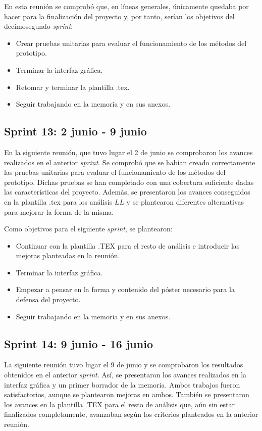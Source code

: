 En esta reunión se comprobó que, en líneas generales, únicamente quedaba por hacer para la finalización del proyecto y, por tanto, serían los objetivos del decimosegundo \textit{sprint}:
\begin{itemize}
\item Crear pruebas unitarias para evaluar el funcionamiento de los métodos del prototipo.
\item Terminar la interfaz gráfica.
\item Retomar y terminar la plantilla .tex.
\item Seguir trabajando en la memoria y en sus anexos.
\end{itemize}


\subsection{Sprint 13: 2 junio - 9 junio}
En la siguiente reunión, que tuvo lugar el 2 de junio se comprobaron los avances realizados en el anterior \textit{sprint}. Se comprobó que se habían creado correctamente las pruebas unitarias para evaluar el funcionamiento de los métodos del prototipo. Dichas pruebas se han completado con una cobertura suficiente dadas las características del proyecto. Además, se presentaron los avances conseguidos en la plantilla .tex para los análisis $LL$ y se plantearon diferentes alternativas para mejorar la forma de la misma.

Como objetivos para el siguiente \textit{sprint}, se plantearon:
\begin{itemize}
\item Continuar con la plantilla .TEX para el resto de análisis e introducir las mejoras planteadas en la reunión.
\item Terminar la interfaz gráfica.
\item Empezar a pensar en la forma y contenido del póster necesario para la defensa del proyecto.
\item Seguir trabajando en la memoria y en sus anexos.
\end{itemize}

\subsection{Sprint 14: 9 junio - 16 junio}

La siguiente reunión tuvo lugar el 9 de junio y se comprobaron los resultados obtenidos en el anterior \textit{sprint}. Así, se presentaron los avances realizados en la interfaz gráfica y un primer borrador de la memoria. Ambos trabajos fueron satisfactorios, aunque se plantearon mejoras en ambos. También se presentaron los avances en la plantilla .TEX para el resto de análisis que, aún sin estar finalizados completamente, avanzaban según los criterios planteados en la anterior reunión.

